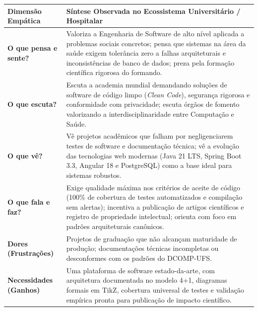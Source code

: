 \begin{quadro}[htb]
\centering
\small
\caption{Mapa de Empatia - Persona 3: Prof. Dr. Gilton Ferreira (Docente e Pesquisador DCOMP).}
\label{qua_empatia_gilton}
\begin{tabularx}{\textwidth}{p{3.8cm} X}
\toprule
\textbf{Dimensão Empática} & \textbf{Síntese Observada no Ecossistema Universitário / Hospitalar} \\
\midrule
\textbf{O que pensa e sente?} & Valoriza a Engenharia de Software de alto nível aplicada a problemas sociais concretos; pensa que sistemas na área da saúde exigem tolerância zero a falhas arquiteturais e inconsistências de banco de dados; preza pela formação científica rigorosa do formando. \\
\midrule
\textbf{O que escuta?} & Escuta a academia mundial demandando soluções de software de código limpo (\textit{Clean Code}), segurança rigorosa e conformidade com privacidade; escuta órgãos de fomento valorizando a interdisciplinaridade entre Computação e Saúde. \\
\midrule
\textbf{O que vê?} & Vê projetos acadêmicos que falham por negligenciarem testes de software e documentação técnica; vê a evolução das tecnologias web modernas (Java 21 LTS, Spring Boot 3.3, Angular 18 e PostgreSQL) como a base ideal para sistemas robustos. \\
\midrule
\textbf{O que fala e faz?} & Exige qualidade máxima nos critérios de aceite de código (100\% de cobertura de testes automatizados e compilação sem alertas); incentiva a publicação de artigos científicos e registro de propriedade intelectual; orienta com foco em padrões arquiteturais canônicos. \\
\midrule
\textbf{Dores (Frustrações)} & Projetos de graduação que não alcançam maturidade de produção; documentações técnicas incompletas ou desconformes com os padrões do DCOMP-UFS. \\
\midrule
\textbf{Necessidades (Ganhos)} & Uma plataforma de software estado-da-arte, com arquitetura documentada no modelo 4+1, diagramas formais em TikZ, cobertura universal de testes e validação empírica pronta para publicação de impacto científico. \\
\bottomrule
\end{tabularx}
\end{quadro}
